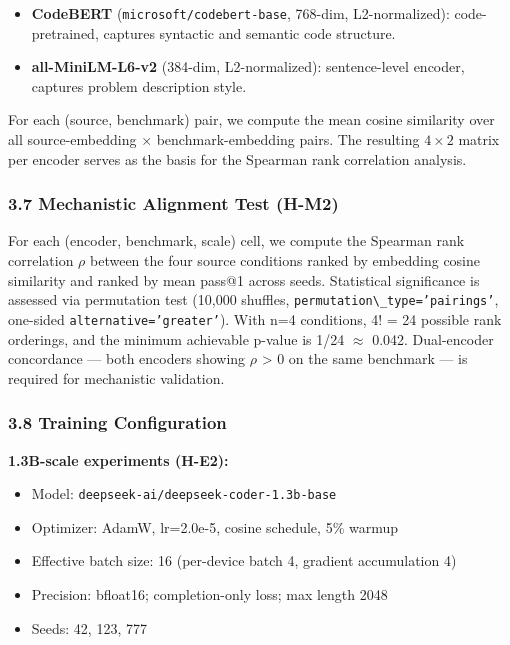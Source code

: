 \begin{itemize}
\item \textbf{CodeBERT} (\texttt{microsoft/codebert-base}, 768-dim, L2-normalized): code-pretrained, captures syntactic and semantic code structure.
\item \textbf{all-MiniLM-L6-v2} (384-dim, L2-normalized): sentence-level encoder, captures problem description style.
\end{itemize}

For each (source, benchmark) pair, we compute the mean cosine similarity over all source-embedding $\times$ benchmark-embedding pairs. The resulting $4\times 2$ matrix per encoder serves as the basis for the Spearman rank correlation analysis.

\subsubsection{3.7 Mechanistic Alignment Test (H-M2)}

For each (encoder, benchmark, scale) cell, we compute the Spearman rank correlation $\rho$ between the four source conditions ranked by embedding cosine similarity and ranked by mean pass@1 across seeds. Statistical significance is assessed via permutation test (10,000 shuffles, \texttt{permutation\textbackslash \_type='pairings'}, one-sided \texttt{alternative='greater'}). With n=4 conditions, 4! = 24 possible rank orderings, and the minimum achievable p-value is 1/24 $\approx$ 0.042. Dual-encoder concordance --- both encoders showing $\rho$ > 0 on the same benchmark --- is required for mechanistic validation.

\subsubsection{3.8 Training Configuration}

\textbf{1.3B-scale experiments (H-E2):}
\begin{itemize}
\item Model: \texttt{deepseek-ai/deepseek-coder-1.3b-base}
\item Optimizer: AdamW, lr=2.0e-5, cosine schedule, 5\% warmup
\item Effective batch size: 16 (per-device batch 4, gradient accumulation 4)
\item Precision: bfloat16; completion-only loss; max length 2048
\item Seeds: 42, 123, 777
\end{itemize}

